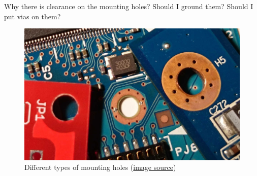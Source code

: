 \documentclass[final]{cubedoc}
\begin{document}
	Why there is clearance on the mounting holes? Should I ground them? Should I put vias on them?
	
	\begin{figure}[h!]
		\centering
		\includegraphics[keepaspectratio, height=.25\textheight, width = .8\textwidth]{assets/mounting_holes.jpg}
		\caption{Different types of mounting holes \small{(\href{https://web.archive.org/web/20200814194327/https://electronics.stackexchange.com/questions/137394/mounting-hole-on-a-pcb?rq=1}{image source}})}
	\end{figure}
	
	
	
	
	
\end{document}
